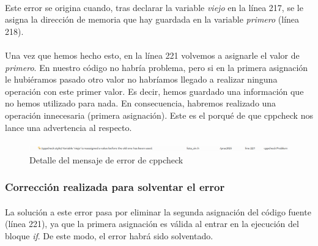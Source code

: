 		\paragraph{}Este error se origina cuando, tras declarar la variable \textit{viejo} en la línea 217, se le asigna la dirección de memoria que hay guardada en la variable \textit{primero} (línea 218).
		
		\paragraph{}Una vez que hemos hecho esto, en la línea 221 volvemos a asignarle el valor de \textit{primero}. En nuestro código no habría problema, pero si en la primera asignación le hubiéramos pasado otro valor no habríamos llegado a realizar ninguna operación con este primer valor. Es decir, hemos guardado una información que no hemos utilizado para nada. En consecuencia, habremos realizado una operación innecesaria (primera asignación). Este es el porqué de que cppcheck nos lance una advertencia al respecto.
		\begin{figure}[H]
			\centering
			\includegraphics[scale=0.38]{img/captura85.png}
			\caption{Detalle del mensaje de error de cppcheck}
			\label{captura85}
		\end{figure}
	
	\subsubsection{Corrección realizada para solventar el error}
	
		\paragraph{}La solución a este error pasa por eliminar la segunda asignación del código fuente (línea 221), ya que la primera asignación es válida al entrar en la ejecución del bloque \textit{if}. De este modo, el error habrá sido solventado.
		
